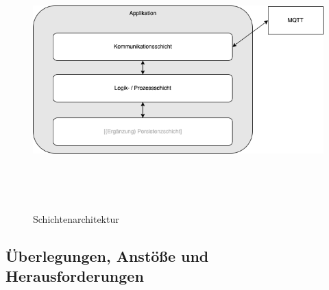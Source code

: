     \begin{figure}[hbt!]
        \centering
        \includegraphics[width=14cm,height=10cm,keepaspectratio]{images/Schichtenarchitektur.png}
        \caption{Schichtenarchitektur}
        \label{fig:schichtenarchitektur}
    \end{figure}

    \subsection{Überlegungen, Anstöße und Herausforderungen}

